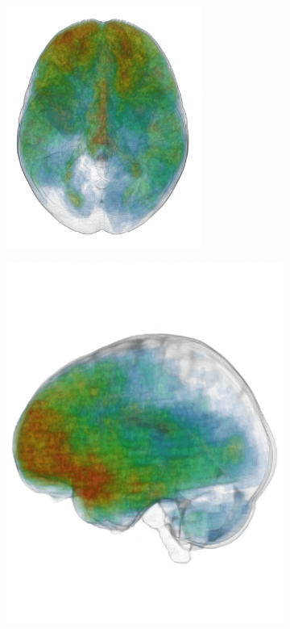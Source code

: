 \begin{figure}[h]
\begin{subfigure}[b]{0.225\textwidth}
	\caption{}
	\label{fig:3dLesionSmalls}
\end{subfigure}
\begin{subfigure}[b]{0.225\textwidth}
	\centering
	\includegraphics[clip=true, trim=10pt 20pt 10pt 20pt, width=0.7\textwidth]{figures/introduction/trio/top1Small.png}
	\caption{}
	\label{fig:spatialMap}
\end{subfigure}
\begin{subfigure}[b]{0.22\textwidth}
	\centering
	\includegraphics[clip=true, trim=0pt 190pt 0pt 0pt, width=1.0\textwidth]{figures/introduction/trio/side1Small.png}

\end{subfigure}
\end{figure}
